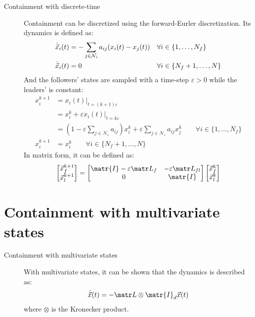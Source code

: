 \begin{description}
    \item[Containment with discrete-time] 
        Containment can be discretized using the forward-Eurler discretization. Its dynamics is defined as:
        \[
            \begin{aligned}
                \dot{{\vec{x}}}_i(t) &= - \sum_{j \in \mathcal{N}_i} a_{ij} (x_i(t) - x_j(t)) & & \forall i \in \{1, \dots, N_f\} \\
                \dot{{\vec{x}}}_i(t) &= 0 & & \forall i \in \{N_f+1, \dots, N\}
            \end{aligned}
        \]
        And the followers' states are sampled with a time-step $\varepsilon > 0$ while the leaders' is constant:
        \[
            \begin{split}
                x_i^{k+1} &= \left.x_i(t)\right|_{t=(k+1)\varepsilon} \\
                &= x_i^k + \varepsilon \left.\dot{x}_i(t)\right|_{t=k\varepsilon} \\
                &= \left( 1 - \varepsilon\sum_{j \in \mathcal{N}_i} a_{ij} \right) x_i^{k} + \varepsilon \sum_{j \in \mathcal{N}_i} a_{ij} x_j^k \qquad \forall i \in \{ 1, \dots, N_f \} \\
                x_i^{k+1} &= x_i^k \qquad \forall i \in \{ N_f+1, \dots, N \}
            \end{split}
        \]
        In matrix form, it can be defined as:
        \[
            \begin{bmatrix}
                \x_f^{k+1} \\ \x_l^{k+1} 
            \end{bmatrix}
            =
            \begin{bmatrix}
                \matr{I} - \varepsilon \lap_f & -\varepsilon \lap_{fl} \\
                0 & \matr{I}
            \end{bmatrix}
            \begin{bmatrix}
                \x_f^k \\ \x_l^k
            \end{bmatrix}
        \]
\end{description}



\section{Containment with multivariate states}

\begin{description}
    \item[Containment with multivariate states]  
        With multivariate states, it can be shown that the dynamics is described as:
        \[
            \dot{\x}(t) = - \lap \otimes \matr{I}_d \x(t)
        \]
        where $\otimes$ is the Kronecker product.
\end{description}